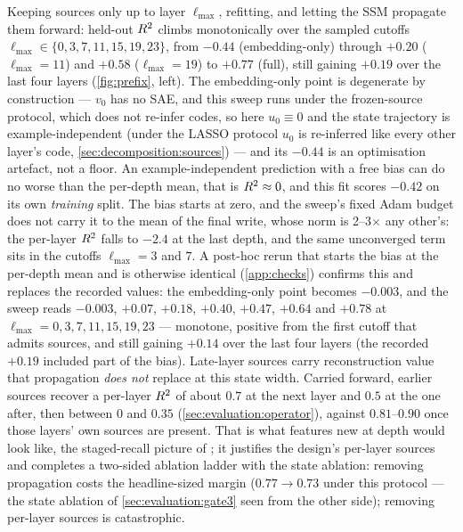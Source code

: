 Keeping sources only up to layer $\ell_{\max}$, refitting, and letting the SSM
propagate them forward: held-out $R^2$ climbs monotonically over the sampled
cutoffs $\ell_{\max} \in \{0,3,7,11,15,19,23\}$, from $-0.44$
(embedding-only) through
$+0.20$ ($\ell_{\max}{=}11$) and $+0.58$ ($\ell_{\max}{=}19$) to $+0.77$
(full), still gaining $+0.19$ over the last four layers
(\cref{fig:prefix}, left). The embedding-only point is degenerate by
construction --- $v_0$ has no SAE, and this sweep runs under the frozen-source
protocol, which does not re-infer codes, so here $u_0 \equiv 0$ and the state
trajectory is example-independent (under the LASSO protocol $u_0$ is re-inferred
like every other layer's code, \cref{sec:decomposition:sources}) --- and its
$-0.44$ is an optimisation artefact, not a floor. An example-independent
prediction with a free bias can do no worse than the per-depth mean, that
is $R^2 \approx 0$, and this fit scores $-0.42$ on its own \emph{training}
split. The bias starts at zero, and the sweep's fixed Adam budget does not
carry it to the mean of the final write, whose norm is 2--3$\times$ any
other's: the per-layer $R^2$ falls to $-2.4$ at the last depth, and the same
unconverged term sits in the cutoffs $\ell_{\max}{=}3$ and $7$. A post-hoc
rerun that starts the bias at the per-depth mean and is otherwise identical
(\cref{app:checks}) confirms this and replaces the recorded values: the
embedding-only point becomes $-0.003$, and the sweep reads $-0.003$, $+0.07$,
$+0.18$, $+0.40$, $+0.47$, $+0.64$ and $+0.78$ at
$\ell_{\max} = 0, 3, 7, 11, 15, 19, 23$ --- monotone, positive from the first
cutoff that admits sources, and still gaining $+0.14$ over the last four
layers (the recorded $+0.19$ included part of the bias). Late-layer sources
carry reconstruction value that propagation \emph{does not} replace at this
state width. Carried forward, earlier sources recover a per-layer $R^2$ of
about $0.7$ at the next layer and $0.5$ at the one after, then between $0$
and $0.35$ (\cref{sec:evaluation:operator}), against $0.81$--$0.90$ once
those layers' own sources are present.
That is what features new at depth would look like, the staged-recall picture
of \citet{geva2023dissecting}; it justifies the design's per-layer sources
and completes a two-sided
ablation ladder with the state ablation: removing propagation costs the
headline-sized margin ($0.77 \to 0.73$ under this protocol --- the state
ablation of \cref{sec:evaluation:gate3} seen from the other side); removing
per-layer sources is catastrophic.

